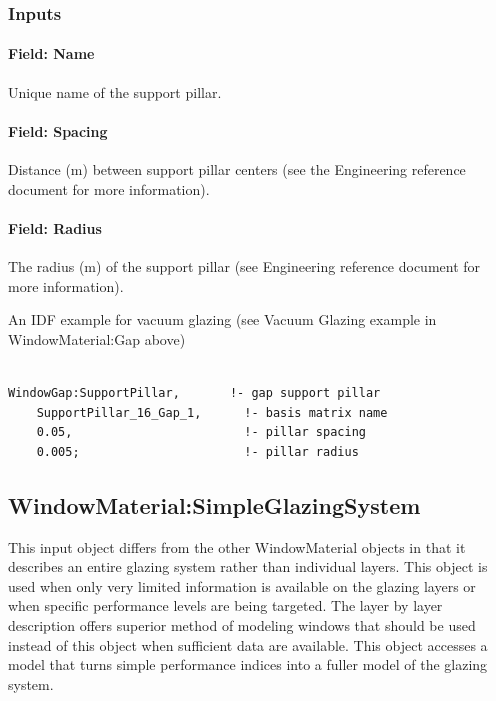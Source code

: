 \subsubsection{Inputs}\label{inputs-20-006}

\paragraph{Field: Name}\label{field-name-14-009}

Unique name of the support pillar.

\paragraph{Field: Spacing}\label{field-spacing}

Distance (m) between support pillar centers (see the Engineering reference document for more information).

\paragraph{Field: Radius}\label{field-radius}

The radius (m) of the support pillar (see Engineering reference document for more information).

An IDF example for vacuum glazing (see Vacuum Glazing example in WindowMaterial:Gap above)

\begin{lstlisting}

WindowGap:SupportPillar,       !- gap support pillar
    SupportPillar_16_Gap_1,      !- basis matrix name
    0.05,                        !- pillar spacing
    0.005;                       !- pillar radius
\end{lstlisting}

\subsection{WindowMaterial:SimpleGlazingSystem}\label{windowmaterialsimpleglazingsystem}


This input object differs from the other WindowMaterial objects in that it describes an entire glazing system rather than individual layers. This object is used when only very limited information is available on the glazing layers or when specific performance levels are being targeted. The layer by layer description offers superior method of modeling windows that should be used instead of this object when sufficient data are available. This object accesses a model that turns simple performance indices into a fuller model of the glazing system.

